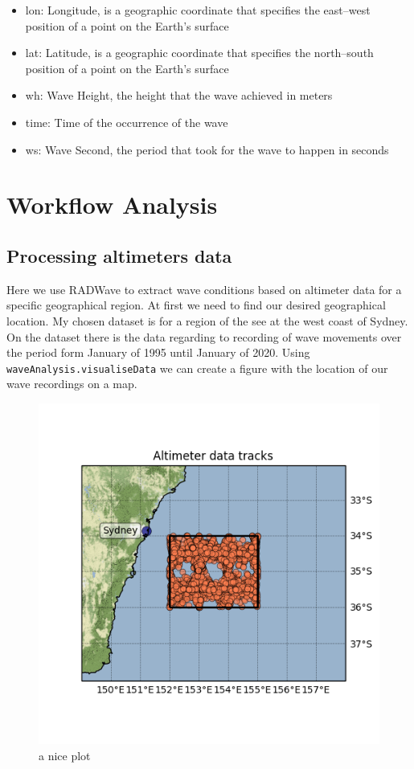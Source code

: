 \documentclass[12pt]{article}
\begin{document}
\begin{itemize}

\item lon: Longitude, is a geographic coordinate that specifies the east–west position of a point on the Earth's surface
\item lat: Latitude, is a geographic coordinate that specifies the north–south position of a point on the Earth's surface
\item wh: Wave Height, the height that the wave achieved in meters 
\item time: Time of the occurrence of the wave
\item ws: Wave Second, the period that took for the wave to happen in seconds

\end{itemize}

\newpage
\section{Workflow Analysis}
\subsection{Processing altimeters data}
Here we use RADWave to extract wave conditions based on altimeter data for a specific geographical region. At first we need to find our desired geographical location. My chosen dataset is for a region of the see at the west coast of Sydney. On the dataset there is the data regarding to recording of wave movements over the period form January of 1995 until January of 2020. Using \texttt{waveAnalysis.visualiseData} we can create a figure with the location of our wave recordings on a map.

\begin{figure}[h]
    \centering
    \includegraphics[width=8 cm]{altimeterdata.png}
    \caption{a nice plot}
    \label{fig:fig1}
\end{figure}
\end{document}
